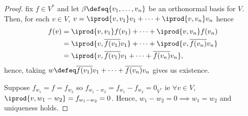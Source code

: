 \begin{proof}
     fix $f \in V^\ast$ and let $\beta \defeq \{v_1, \dots, v_n\}$ be an orthonormal basis for $V$. Then, for each $v\in V$, $v = \iprod{v, v_1} v_1 + \cdots + \iprod{v, v_n} v_n$ hence \begin{align*}
        f(v) &= \iprod{v, v_1} f(v_1) + \cdots + \iprod{v, v_n}f(v_n)\\
        &= \iprod{v, \overline{f(v_1)}v_1} + \cdots + \iprod{v, \overline{f(v_n)}v_n}\\
        &= \iprod{v, \overline{f(v_1)}v_1 + \cdots + \overline{f(v_n)}v_n},
    \end{align*}
    hence, taking $w \defeq \overline{f(v_1)}v_1 + \cdots + \overline{f(v_n)}v_n$ gives us existence.
    
     Suppose $f_{w_1} = f = f_{w_2}$ so $f_{w_1 - w_2} = f_{w_1} - f_{w_2} = 0_{V^\ast}$ ie $\forall v \in V$, $\iprod{v, w_1 - w_2} = f_{w_1 - w_2} = 0$. Hence, $w_1 - w_2 = 0 \implies w_1 = w_2$ and uniqueness holds.
\end{proof}